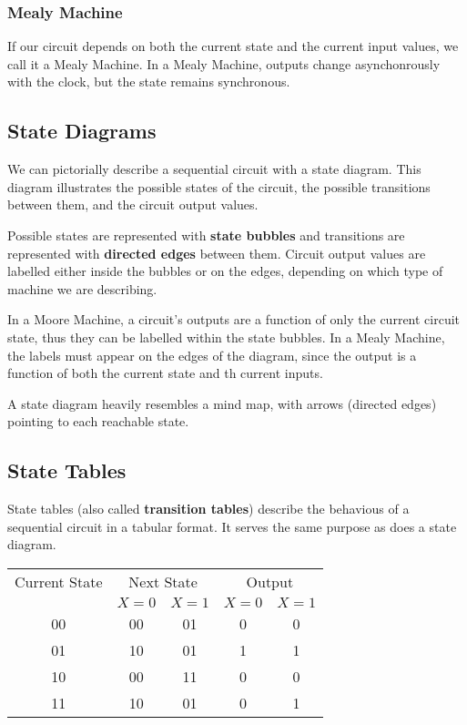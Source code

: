 \documentclass[12pt]{article}
\begin{document}
\subsubsection*{Mealy Machine}
If our circuit depends on both the current state and the current input values, we call it a Mealy Machine. In a Mealy Machine, outputs change asynchonrously with the clock, but the state remains synchronous.

\subsection*{State Diagrams}
We can pictorially describe a sequential circuit with a state diagram. This diagram illustrates the possible states of the circuit, the possible transitions between them, and the circuit output values.

Possible states are represented with {\bf state bubbles} and transitions are represented with {\bf directed edges} between them. Circuit output values are labelled either inside the bubbles or on the edges, depending on which type of machine we are describing.

In a Moore Machine, a circuit's outputs are a function of only the current circuit state, thus they can be labelled within the state bubbles. In a Mealy Machine, the labels must appear on the edges of the diagram, since the output is a function of both the current state and th current inputs.

A state diagram heavily resembles a mind map, with arrows (directed edges) pointing to each reachable state.

\subsection*{State Tables}
State tables (also called {\bf transition tables}) describe the behavious of a sequential circuit in a tabular format. It serves the same purpose as does a state diagram.

\begin{table}[ht]
\centering
\begin{tabular}{*5c}
  \toprule
  Current State & \multicolumn{2}{c}{Next State} & \multicolumn{2}{c}{Output}\\
                & $X = 0$       & $X = 1$        & $X = 0$       & $X = 1$\\
  \midrule

  00 & 00 & 01 & 0 & 0\\
  01 & 10 & 01 & 1 & 1\\
  10 & 00 & 11 & 0 & 0\\
  11 & 10 & 01 & 0 & 1\\
  \bottomrule
\end{tabular}
\end{table}
\end{document}
